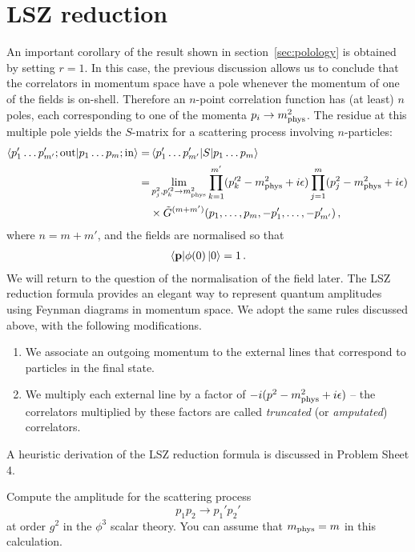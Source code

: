 \documentclass[notes]{subfiles}
\begin{document}
\section{LSZ reduction}
\label{sec:lsz-reduction}

An important corollary of the result shown in
section~\ref{sec:polology} is obtained by setting $r=1$. In this case,
the previous discussion allows us to conclude that the correlators in
momentum space have a pole whenever the momentum of one of the fields
is on-shell. Therefore an $n$-point correlation function has (at
least) $n$ poles, each corresponding to one of the momenta
$p_i\to m_\mathrm{phys}^2$. The residue at this multiple pole yields the $S$-matrix
for a scattering process involving $n$-particles:
\begin{align}
   \braket{ p_{1}' \ldots p_{m'}'; \mathrm{out} }{ p_{1} \ldots p_{m};
  \mathrm{in}}
  =& 
  \mel{p_{1}' \ldots p_{m'}'}{S}{p_{1} \ldots p_{m}} \\
  =& 
  \lim_{p_j^2,p_k'^2 \to m_\mathrm{phys}^2} \prod_{k=1}^{m'}
  (p_k'^2-m_\mathrm{phys}^2+i\epsilon)
  \prod_{j=1}^{m}
  (p_j^2-m_\mathrm{phys}^2+i\epsilon) \, \nonumber \\
  & \times 
    \tilde{G}^{(m+m')}(p_1, \ldots, p_{m}, -p_1', \ldots, -p_{m'}')\, ,
\end{align}
where $n=m+m'$, and the fields are normalised so that
\begin{align}
  \langle \mathbf{p} | \phi(0) \ket{0} = 1\,.
\end{align}
We will return to the question of the normalisation of the field
later. The LSZ reduction formula provides an elegant way to represent
quantum amplitudes using Feynman diagrams in momentum space. We adopt
the same rules discussed above, with the following modifications.
\begin{enumerate}
\item We associate an outgoing momentum to the external lines that
  correspond to particles in the final state. 
\item We multiply each external line by a factor of
  $-i(p^2-m_\mathrm{phys}^2+i\epsilon)$ -- the correlators multiplied by these
  factors are called \emph{truncated} (or \emph{amputated}) correlators.
\end{enumerate}

A heuristic derivation of the LSZ reduction formula is discussed in
Problem Sheet 4.

\begin{Ex}
  Compute the amplitude for the scattering process
  \[
    p_1 p_2 \longrightarrow p_1' p_2'
  \]
  at order $g^2$ in the $\phi^3$ scalar theory. You can assume that
  $m_\mathrm{phys}=m$ in this calculation.
\end{Ex}
\end{document}
